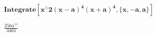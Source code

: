 \documentclass{article}
\begin{document}
\begin{doublespace}
\noindent\(\pmb{\text{Integrate}\left[x{}^{\wedge}2(x-a)^4 (x+a)^4 ,\{x,-a,a\}\right]}\)
\end{doublespace}

\begin{doublespace}
\noindent\(\frac{256 a^{11}}{3465}\)
\end{doublespace}
\end{document}

